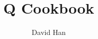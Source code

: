 \documentclass[a4paper,twoside]{scrbook}
\begin{document}
\title{Q Cookbook}
\author{David Han}
\frontmatter
\maketitle
\setcounter{tocdepth}{1}
\tableofcontents
\mainmatter






\end{document}
